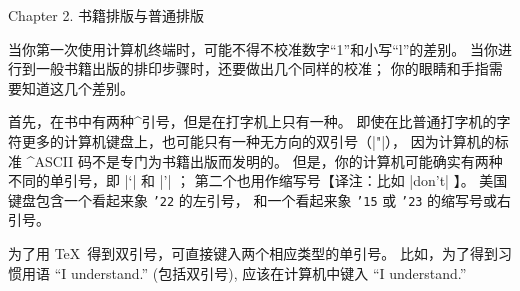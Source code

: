 


\beginchapter Chapter 2. 书籍排版与普通排版


\1当你第一次使用计算机终端时，可能不得不校准数字``1''和小写``l''的差别。%
当你进行到一般书籍出版的排印步骤时，还要做出几个同样的校准；%
你的眼睛和手指需要知道这几个差别。

首先，在书中有两种^{引号}，但是在打字机上只有一种。
即使在比普通打字机的字符更多的计算机键盘上，也可能只有一种无方向的双引号（|"|），
因为计算机的标准 ^{ASCII} 码不是专门为书籍出版而发明的。
但是，你的计算机可能确实有两种不同的单引号，即 |`| 和 |'| ；
第二个也用作缩写号【译注：比如 |don't| 】。
美国键盘包含一个看起来象 {\tt\char'22} 的左引号，
和一个看起来象 {\tt\char'15} 或 {\tt\char'23} 的缩写号或右引号。

为了用 \TeX\ 得到双引号，可直接键入两个相应类型的单引号。%
比如，为了得到习惯用语
\begindisplay
``I understand.''
\enddisplay
(包括双引号), 应该在计算机中键入
\begintt
``I understand.''
\endtt

